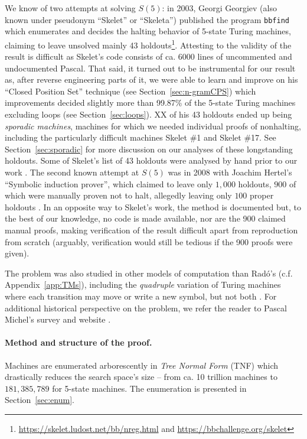 \documentclass[a4paper,british]{article}
\theoremstyle{definition} %
\numberwithin{equation}{section}
\theoremstyle{definition} %
\newcommand{\ts}[1]{{\color{red}#1}}
\newcommand{\BBtheFifthTNF}{181{,}385{,}789}
\newcommand{\rado}{Rad\'o\xspace}
\begin{document}
\newcommand{\SkeletHoldoutsSporadic}{\ts{XX}\xspace}

We know of two attempts at solving $S(5)$: in 2003, Georgi Georgiev (also known under pseudonym ``Skelet'' or ``Skeleta'') published the program \texttt{bbfind} \cite{Skelet_bbfind} which enumerates and decides the halting behavior of 5-state Turing machines, claiming to leave unsolved mainly 43 holdouts\footnote{\url{https://skelet.ludost.net/bb/nreg.html} and \url{https://bbchallenge.org/skelet}}. Attesting to the validity of the result is difficult as Skelet's code consists of ca. 6000 lines of uncommented and undocumented Pascal. That said, it turned out to be instrumental for our result as, after reverse engineering parts of it, we were able to learn and improve on his ``Closed Position Set'' technique (see Section~\ref{sec:n-gramCPS}) which improvements decided slightly more than 99.87\% of the 5-state Turing machines excluding loops (see Section~\ref{sec:loops}). \SkeletHoldoutsSporadic of his 43 holdouts ended up being \textit{sporadic machines}, \ie machines for which we needed individual proofs of nonhalting, including the particularly difficult machines Skelet \#1 and Skelet \#17. See Section~\ref{sec:sporadic} for more discussion on our analyses of these longstanding holdouts. Some of Skelet's list of 43 holdouts were analysed by hand prior to our work \cite{DanBriggs}. The second known attempt at $S(5)$ was in 2008 with Joachim Hertel's ``Symbolic induction prover'', which claimed to leave only $1{,}000$ holdouts, $900$ of which were manually proven not to halt, allegedly leaving only $100$ proper holdouts \cite{Hertel}. In an opposite way to Skelet's work, the method is documented but, to the best of our knowledge, no code is made available, nor are the 900 claimed manual proofs, making verification of the result difficult apart from reproduction from scratch (arguably, verification would still be tedious if the 900 proofs were given).

The \BBfull problem was also studied in other models of computation than \rado's (c.f. Appendix~\ref{app:TMs}), including the \textit{quadruple} variation of Turing machines where each transition may move or write a new symbol, but not both \cite{Ross2003,Ross2005}. For additional historical perspective on the \BBfull problem, we refer the reader to Pascal Michel's survey and website \cite{michel2019busy,PMichel_website}.

\paragraph{Method and structure of the proof.} Machines are enumerated arborescently in \textit{Tree Normal Form} (TNF) \cite{Brady64} which drastically reduces the search space's size -- \eg from ca. 10 trillion machines to $\BBtheFifthTNF$ for 5-state machines. The enumeration is presented in Section~\ref{sec:enum}.
\end{document}
